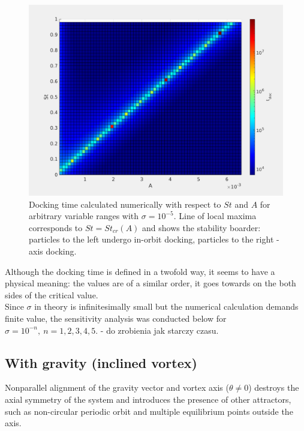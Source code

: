 \documentclass[../main.tex]{subfiles}
\begin{document}
\begin{figure}
\centering
\noindent \includegraphics[width=30pc]{gfx/surf_logtdoc_vs_A_vs_St_full.png}
\caption{Docking time calculated numerically with respect to $St$ and $A$ for arbitrary variable ranges with $\sigma=10^{-5}$. Line of local maxima corresponds to $St=St_{cr}(A)$ and shows the stability boarder: particles to the left undergo in-orbit docking, particles to the right - axis docking.}
\label{fig:ch3_4}
\end{figure}

Although the docking time is defined in a twofold way, it seems to have a physical meaning: the values are of a similar order, it goes towards on the both sides of the critical value.\\
Since $\sigma$ in theory is infinitesimally small but the numerical calculation demands finite value, the sensitivity analysis was conducted below for $\sigma=10^{-n}, \ n=1,2,3,4,5$. - do zrobienia jak starczy czasu.\\


\subsection{With gravity (inclined vortex)}
\noindent Nonparallel alignment of the gravity vector and vortex axis ($\theta \neq 0$) destroys the axial symmetry of the system and introduces the presence of other attractors, such as non-circular periodic orbit and multiple equilibrium points outside the axis.\\
 
\end{document}
